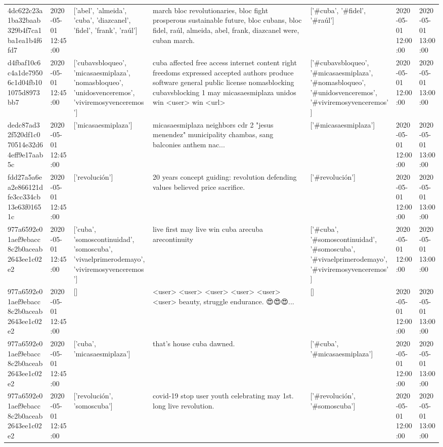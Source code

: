\begin{tabular}{lllllll}
4dc622c23a1ba32baab329b4f7ca1ba1ea1b4f6fd7 & 2020-05-01 12:45:00 & ['abel', 'almeida', 'cuba', 'diazcanel', 'fidel', 'frank', 'raúl'] & march bloc revolutionaries, bloc fight prosperous sustainable future, bloc cubans, bloc fidel, raúl, almeida, abel, frank, diazcanel were, cuban march. & ['#cuba', '#fidel', '#raúl'] & 2020-05-01 12:00:00 & 2020-05-01 13:00:00 \\
d4fbaf10c6c4a1de79506c1d04fb101075d8973bb7 & 2020-05-01 12:45:00 & ['cubavsbloqueo', 'micasaesmiplaza', 'nomasbloqueo', 'unidosvenceremos', 'viviremosyvenceremos'] & cuba affected free access internet content right freedoms expressed accepted authors produce software general public license nomasblocking cubavsblocking 1 may micasaesmiplaza unidos win <user> win <url> & ['#cubavsbloqueo', '#micasaesmiplaza', '#nomasbloqueo', '#unidosvenceremos', '#viviremosyvenceremos'] & 2020-05-01 12:00:00 & 2020-05-01 13:00:00 \\
dedc87ad32f520df1c070514e32d64eff9e17aab5c & 2020-05-01 12:45:00 & ['micasaesmiplaza'] & micasaesmiplaza neighbors cdr 2 "jesus menendez" municipality chambas, sang balconies anthem nac... & ['#micasaesmiplaza'] & 2020-05-01 12:00:00 & 2020-05-01 13:00:00 \\
fdd27a5a6ea2e866121dfe3cc334cb13e63f01651c & 2020-05-01 12:45:00 & ['revolución'] & 20 years concept guiding: revolution defending values believed price sacrifice. & ['#revolución'] & 2020-05-01 12:00:00 & 2020-05-01 13:00:00 \\
977a6592e01aef9ebacc8c2b0aceab2643ee1c02e2 & 2020-05-01 12:45:00 & ['cuba', 'somoscontinuidad', 'somoscuba', 'vivaelprimerodemayo', 'viviremosyvenceremos'] & live first may live win cuba arecuba arecontinuity & ['#cuba', '#somoscontinuidad', '#somoscuba', '#vivaelprimerodemayo', '#viviremosyvenceremos'] & 2020-05-01 12:00:00 & 2020-05-01 13:00:00 \\
977a6592e01aef9ebacc8c2b0aceab2643ee1c02e2 & 2020-05-01 12:45:00 & [] & <user> <user> <user> <user> <user> <user> beauty, struggle endurance. 😍😍😍... & [] & 2020-05-01 12:00:00 & 2020-05-01 13:00:00 \\
977a6592e01aef9ebacc8c2b0aceab2643ee1c02e2 & 2020-05-01 12:45:00 & ['cuba', 'micasaesmiplaza'] & that's house cuba dawned. & ['#cuba', '#micasaesmiplaza'] & 2020-05-01 12:00:00 & 2020-05-01 13:00:00 \\
977a6592e01aef9ebacc8c2b0aceab2643ee1c02e2 & 2020-05-01 12:45:00 & ['revolución', 'somoscuba'] & covid-19 stop user youth celebrating may 1st. long live revolution. & ['#revolución', '#somoscuba'] & 2020-05-01 12:00:00 & 2020-05-01 13:00:00 \\

\end{tabular}
